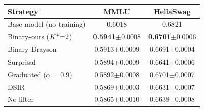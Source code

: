 \begin{tabular}{lcc}
\toprule
\textbf{Strategy} & \textbf{MMLU} & \textbf{HellaSwag} \\
\midrule
Base model (no training) & 0.6018 & 0.6821 \\
\midrule
Binary-ours (${K^*}{=}2$) & \textbf{0.5941}$\pm$0.0008 & \textbf{0.6701}$\pm$0.0006 \\
Binary-Drayson & 0.5913$\pm$0.0009 & 0.6691$\pm$0.0004 \\
Surprisal & 0.5894$\pm$0.0009 & 0.6641$\pm$0.0006 \\
Graduated ($\alpha{=}0.9$) & 0.5892$\pm$0.0008 & 0.6701$\pm$0.0007 \\
DSIR & 0.5869$\pm$0.0003 & 0.6631$\pm$0.0007 \\
No filter & 0.5865$\pm$0.0010 & 0.6638$\pm$0.0008 \\
\bottomrule
\end{tabular}
